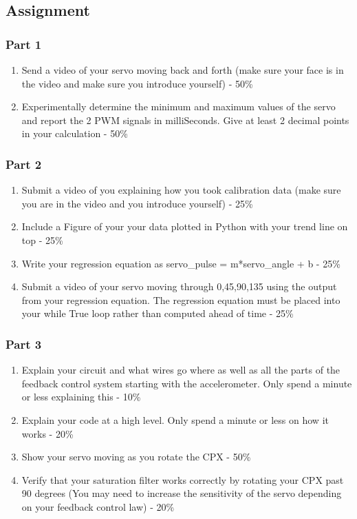 \subsection{Assignment}



\subsubsection{Part 1}
\begin{enumerate}[itemsep=-5pt]
\item Send a video of your servo moving back and forth (make sure your face is in the video and make sure you introduce yourself) - 50\%
\item Experimentally determine the minimum and maximum values of the servo and report the 2 PWM signals in milliSeconds. Give at least 2 decimal points in your calculation - 50\%
\end{enumerate}
\subsubsection{Part 2}
\begin{enumerate}[itemsep=-5pt]
\item Submit a video of you explaining how you took calibration data (make sure you are in the video and you introduce yourself) - 25\%
\item Include a Figure of your your data plotted in Python with your trend line on top - 25\%
\item Write your regression equation as servo\_pulse = m*servo\_angle + b - 25\%
\item Submit a video of your servo moving through 0,45,90,135 using the output from your regression equation. The regression equation must be placed into your while True loop rather than computed ahead of time -  25\% 
\end{enumerate}
\subsubsection{Part 3}
\begin{enumerate}[itemsep=-5pt]
\item Explain your circuit and what wires go where as well as all the parts of the feedback control system starting with the accelerometer. Only spend a minute or less explaining this - 10\%
\item Explain your code at a high level. Only spend a minute or less on how it works - 20\%
\item Show your servo moving as you rotate the CPX - 50\%
\item Verify that your saturation filter works correctly by rotating your CPX past 90 degrees (You may need to increase the sensitivity of the servo depending on your feedback control law) - 20\% 
\end{enumerate}
